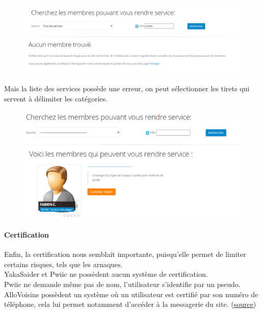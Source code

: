 \documentclass[a4paper,11pt]{article}
\begin{document}
\begin{figure}[H]
  \includegraphics[width=\linewidth]{images/pas-trouve-yakasaider.png}
  \label{fig:pas-trouve-yakasaider}
\end{figure}

Mais la liste des services possède une erreur, on peut sélectionner les tirets qui servent à délimiter les catégories.\\

\begin{figure}[H]
  \includegraphics[width=\linewidth]{images/erreur-yakasaider.png}
  \label{fig:erreur-yakasaider}
\end{figure}

\paragraph{Certification}

Enfin, la certification nous semblait importante, puisqu’elle permet de limiter certains risques, tels que les arnaques.\\

YakaSaider et Pwiic ne possèdent aucun système de certification.\\

Pwiic ne demande même pas de nom, l’utilisateur s’identifie par un pseudo.\\

AlloVoisins possèdent un système où un utilisateur est certifié par son numéro de téléphone,
cela lui permet notamment d’accéder à la messagerie du site. (\href{https://support.allovoisins.com/hc/fr/articles/360000816614-Pourquoi-dois-je-certifier-mon-num%C3%A9ro-de-mobile-pour-pouvoir-acc%C3%A9der-%C3%A0-la-messagerie-}{source})
\end{document}
